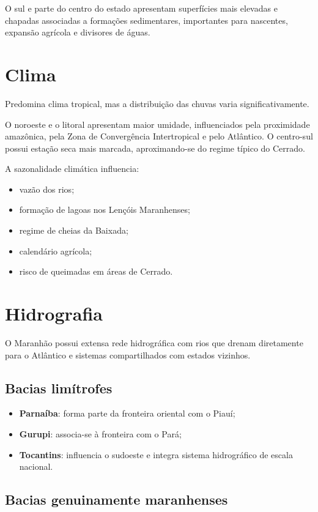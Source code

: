 O sul e parte do centro do estado apresentam superfícies mais elevadas e chapadas associadas a formações sedimentares, importantes para nascentes, expansão agrícola e divisores de águas.

\section{Clima}

Predomina clima tropical, mas a distribuição das chuvas varia significativamente.

O noroeste e o litoral apresentam maior umidade, influenciados pela proximidade amazônica, pela Zona de Convergência Intertropical e pelo Atlântico. O centro-sul possui estação seca mais marcada, aproximando-se do regime típico do Cerrado.

A sazonalidade climática influencia:
\begin{itemize}
\item vazão dos rios;
\item formação de lagoas nos Lençóis Maranhenses;
\item regime de cheias da Baixada;
\item calendário agrícola;
\item risco de queimadas em áreas de Cerrado.
\end{itemize}

\section{Hidrografia}

O Maranhão possui extensa rede hidrográfica com rios que drenam diretamente para o Atlântico e sistemas compartilhados com estados vizinhos.

\subsection{Bacias limítrofes}

\begin{itemize}
\item \textbf{Parnaíba}: forma parte da fronteira oriental com o Piauí;
\item \textbf{Gurupi}: associa-se à fronteira com o Pará;
\item \textbf{Tocantins}: influencia o sudoeste e integra sistema hidrográfico de escala nacional.
\end{itemize}

\subsection{Bacias genuinamente maranhenses}

